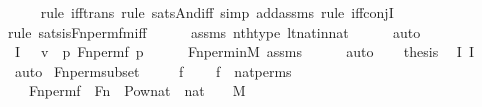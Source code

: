 \begin{isabellebody}
\ \ \ \ \isamarkupfalse%
{\isacharparenleft}{\kern0pt}rule\ iff{\isacharunderscore}{\kern0pt}trans{\isacharcomma}{\kern0pt}\ rule\ sats{\isacharunderscore}{\kern0pt}And{\isacharunderscore}{\kern0pt}iff{\isacharcomma}{\kern0pt}\ simp\ add{\isacharcolon}{\kern0pt}assms{\isacharcomma}{\kern0pt}\ rule\ iff{\isacharunderscore}{\kern0pt}conjI{}{\isacharparenright}{\kern0pt}\isanewline
\ \ \ \ \ \isamarkupfalse%
{\isacharparenleft}{\kern0pt}rule\ sats{\isacharunderscore}{\kern0pt}is{\isacharunderscore}{\kern0pt}Fn{\isacharunderscore}{\kern0pt}perm{\isacharunderscore}{\kern0pt}fm{\isacharunderscore}{\kern0pt}iff{\isacharparenright}{\kern0pt}\isanewline
\ \ \ \ \isamarkupfalse%
\ assms\ nth{\isacharunderscore}{\kern0pt}type\ lt{\isacharunderscore}{\kern0pt}nat{\isacharunderscore}{\kern0pt}in{\isacharunderscore}{\kern0pt}nat\isanewline
\ \ \ \ \isamarkupfalse%
\ auto\isanewline
\ \ \isamarkupfalse%
\ \isamarkupfalse%
\ I{}{\isacharcolon}{\kern0pt}\ {\isachardoublequoteopen}{\isachardot}{\kern0pt}{\isachardot}{\kern0pt}{\isachardot}{\kern0pt}\ {\isasymlongleftrightarrow}\ v\ {\isacharequal}{\kern0pt}\ {\isacharless}{\kern0pt}p{\isacharcomma}{\kern0pt}\ Fn{\isacharunderscore}{\kern0pt}perm{\isacharparenleft}{\kern0pt}f{\isacharcomma}{\kern0pt}\ p{\isacharparenright}{\kern0pt}{\isachargreater}{\kern0pt}{\isachardoublequoteclose}\isanewline
\ \ \ \ \isamarkupfalse%
\ Fn{\isacharunderscore}{\kern0pt}perm{\isacharunderscore}{\kern0pt}in{\isacharunderscore}{\kern0pt}M\ assms\isanewline
\ \ \ \ \isamarkupfalse%
\ auto\isanewline
\ \ \isamarkupfalse%
\ {\isacharquery}{\kern0pt}thesis\ \isamarkupfalse%
\ I{}\ I{}\ \isamarkupfalse%
\ auto\isanewline
{}\isamarkupfalse%
%
\endisatagproof
{\isafoldproof}%
%
\isadelimproof
\isanewline
%
\endisadelimproof
\isanewline
{}\isamarkupfalse%
\ Fn{\isacharunderscore}{\kern0pt}perm{\isacharprime}{\kern0pt}{\isacharunderscore}{\kern0pt}subset\ {\isacharcolon}{\kern0pt}\ \isanewline
\ \ \ f\ \isanewline
\ \ \ {\isachardoublequoteopen}f\ {\isasymin}\ nat{\isacharunderscore}{\kern0pt}perms{\isachardoublequoteclose}\ \isanewline
\ \ \ {\isachardoublequoteopen}Fn{\isacharunderscore}{\kern0pt}perm{\isacharprime}{\kern0pt}{\isacharparenleft}{\kern0pt}f{\isacharparenright}{\kern0pt}\ {\isasymsubseteq}\ Fn\ {\isasymtimes}\ {\isacharparenleft}{\kern0pt}Pow{\isacharparenleft}{\kern0pt}{\isacharparenleft}{\kern0pt}nat\ {\isasymtimes}\ nat{\isacharparenright}{\kern0pt}\ {\isasymtimes}\ {}{\isacharparenright}{\kern0pt}\ {\isasyminter}\ M{\isacharparenright}{\kern0pt}{\isachardoublequoteclose}\ \isanewline

\end{isabellebody}

